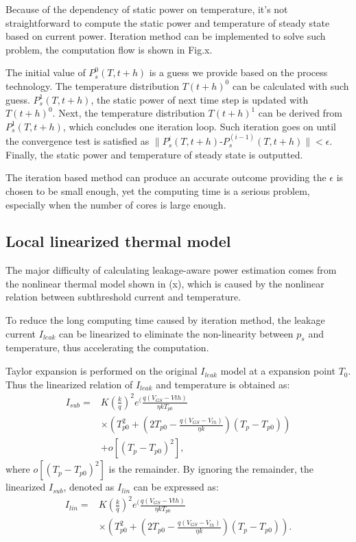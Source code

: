 Because of the dependency of static power on temperature, it's not straightforward to compute the static power and temperature of steady state based on current power. Iteration method can be implemented to solve such problem, the computation flow is shown in Fig.x.

The initial value of $P^0_s(T,t+h)$ is a guess we provide based on the process technology. The temperature distribution $T(t+h)^0$ can be calculated with such guess. $P^1_s(T,t+h)$, the static power of next time step is updated with $T(t+h)^0$. Next, the temperature distribution $T(t+h)^1$ can be derived from $P^1_s(T,t+h)$, which concludes one iteration loop. Such iteration goes on until the convergence test is satisfied as $\parallel P^i_s(T,t+h)$-$P^(i-1)_s(T,t+h)\parallel<\epsilon$. Finally, the static power and temperature of steady state is outputted.

The iteration based method can produce an accurate outcome providing the $\epsilon$ is chosen to be small enough, yet the computing time is a serious problem, especially when the number of cores is large enough.

\subsection{Local linearized thermal model}
The major difficulty of calculating leakage-aware power estimation comes from the nonlinear thermal model shown in (x), which is caused by the nonlinear relation between subthreshold current and temperature.

To reduce the long computing time caused by iteration method, the leakage current $I_{leak}$ can be linearized to eliminate the non-linearity between $p_{s}$ and temperature, thus accelerating the computation.

Taylor expansion is performed on the original $I_{leak}$ model at a expansion point $T_{0}$. Thus the linearized relation of $I_{leak}$ and temperature is obtained as:
\begin{equation}\label{linear_subthreshold}
\begin{split}
I_{sub} = &K(\frac{k}{q})^{2}e^(\frac{q(V_{GS}-V{th})}{\eta kT_{p0}}\\
&\times (T_{p0}^{2}+(2T_{p0}-\frac{q(V_{GS}-V_{th})}{\eta k})(T_{p}-T_{p0}))\\
&+ o[(T_{p}-T_{p0})^{2}],
\end{split}
\end{equation}
where $o[(T_{p}-T_{p0})^{2}]$ is the remainder. By ignoring the remainder, the linearized $I_{sub}$, denoted as $I_{lin}$ can be expressed as:
\begin{equation}\label{linear_subthreshold}
\begin{split}
I_{lin} = &K(\frac{k}{q})^{2}e^(\frac{q(V_{GS}-V{th})}{\eta kT_{p0}}\\
&\times (T_{p0}^{2}+(2T_{p0}-\frac{q(V_{GS}-V_{th})}{\eta k})(T_{p}-T_{p0})).
\end{split}
\end{equation}

